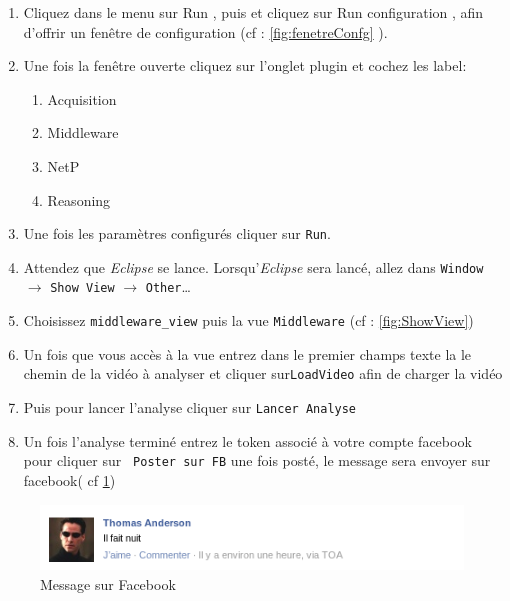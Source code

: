 \begin{enumerate}
 \item Cliquez dans le menu sur \og Run \fg, puis et cliquez sur \og Run configuration \fg, 
afin d'offrir un fenêtre de configuration (cf : \ref{fig:fenetreConfg} ).
  \item Une fois la fenêtre ouverte cliquez sur l'onglet plugin et cochez les label:
  \begin{enumerate}
      \item Acquisition
      \item Middleware
      \item NetP
      \item Reasoning
      \end{enumerate}
      \item Une fois les paramètres configurés cliquer sur \verb+Run+.
      \item Attendez que \emph{Eclipse} se lance. Lorsqu'\emph{Eclipse} sera lancé, allez dans \verb+Window+ $\rightarrow$ \verb+Show View+ $\rightarrow$ \verb+Other+\dots
      \item Choisissez \verb+middleware_view+ puis la vue \verb+Middleware+ (cf : \ref{fig:ShowView})
      \item Un fois que vous accès à la vue entrez dans le premier champs texte la le chemin de la vidéo à analyser et cliquer sur\verb+LoadVideo+ afin de charger la vidéo
      \item Puis pour lancer l'analyse cliquer sur \verb+Lancer Analyse+
      \item Un fois l'analyse terminé entrez le token associé à votre compte facebook pour cliquer sur \verb+ Poster sur FB+ une fois posté, le message sera envoyer sur facebook( cf \ref{fig:messageFB})
  \end{enumerate}
\begin{figure}[h]
	  \centering
	  \includegraphics[scale=0.5]{img/cestlanuit}
	  \caption{Message sur Facebook}
	  \label{fig:messageFB}
\end{figure}
